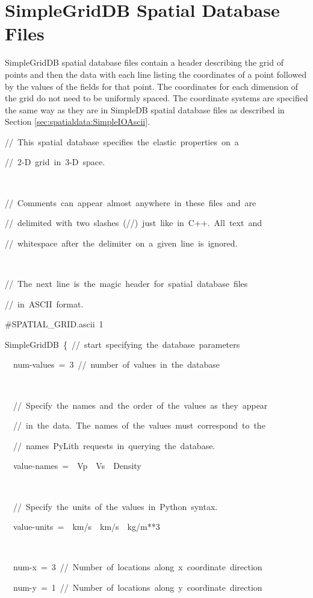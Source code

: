 \section{\label{sec:format:SimpleGridDB}SimpleGridDB Spatial Database
Files}

SimpleGridDB spatial database files contain a header describing the
grid of points and then the data with each line listing the coordinates
of a point followed by the values of the fields for that point. The
coordinates for each dimension of the grid do not need to be uniformly
spaced. The coordinate systems are specified the same way as they
are in SimpleDB spatial database files as described in Section \vref{sec:spatialdata:SimpleIOAscii}. 
\begin{lyxcode}
//~This~spatial~database~specifies~the~elastic~properties~on~a

//~2-D~grid~in~3-D~space.

~

//~Comments~can~appear~almost~anywhere~in~these~files~and~are

//~delimited~with~two~slashes~(//)~just~like~in~C++.~All~text~and~

//~whitespace~after~the~delimiter~on~a~given~line~is~ignored.

~

//~The~next~line~is~the~magic~header~for~spatial~database~files~

//~in~ASCII~format.

\#SPATIAL\_GRID.ascii~1

SimpleGridDB~\{~//~start~specifying~the~database~parameters

~~num-values~=~3~//~number~of~values~in~the~database

~

~~//~Specify~the~names~and~the~order~of~the~values~as~they~appear~

~~//~in~the~data.~The~names~of~the~values~must~correspond~to~the

~~//~names~PyLith~requests~in~querying~the~database.

~~value-names~=~~Vp~~Vs~~Density

~

~~//~Specify~the~units~of~the~values~in~Python~syntax.

~~value-units~=~~km/s~~km/s~~kg/m{*}{*}3

~~

~~num-x~=~3~//~Number~of~locations~along~x~coordinate~direction

~~num-y~=~1~//~Number~of~locations~along~y~coordinate~direction


\end{lyxcode}

